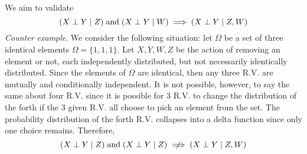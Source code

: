 \documentclass{article}
\newcommand{\s}{\hspace{0.1cm}}
\numberwithin{equation}{section}
\begin{document}
\subsection{}
We aim to validate
\begin{equation}
        (X \perp Y \mid Z) \s \text{and} \s (X \perp Y \mid W) \implies (X \perp Y \mid Z,W)
\end{equation}
\textit{Counter example}. We consider the following situation: let 
$\Omega$ be a set of three identical elements 
$\Omega = \{1, 1, 1\}$. Let $X, Y, W, Z$ be the action of removing 
an element or not, each independently distributed, but not necessarily 
identically distributed. Since the elements of $\Omega$ are identical, then 
any three R.V. are mutually and conditionally independent. It is not possible,
however, to say the same about four R.V. since it is possible for 3 R.V. to change 
the distribution of the forth if the 3 given R.V. all choose to pick an element from the 
set. The probability distribution of the forth R.V. collapses into a delta function since 
only one choice remains. Therefore,
\[
        (X \perp Y \mid Z) \s \text{and} \s (X \perp Y \mid Z) 
        \centernot\implies (X \perp Y \mid Z,W) 
\]
\end{document}
